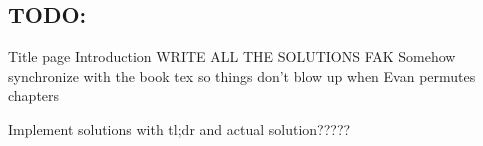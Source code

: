 \subsection{TODO:}

Title page Introduction WRITE ALL THE SOLUTIONS FAK Somehow synchronize with the book tex so things don't blow up when Evan permutes chapters 

Implement solutions with tl;dr and actual solution?????